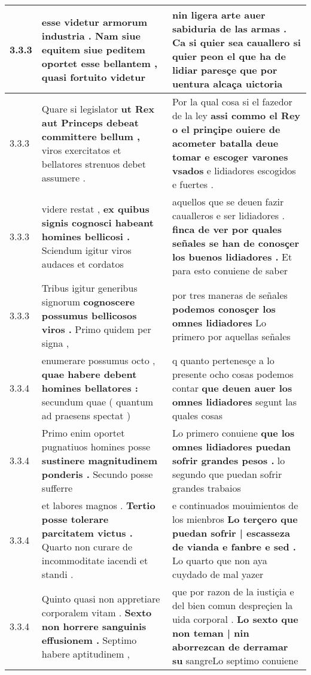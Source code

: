 \begin{tabular}{|p{1cm}|p{6.5cm}|p{6.5cm}|}
3.3.3 & esse videtur armorum industria . \textbf{ Nam siue equitem siue peditem oportet esse bellantem , } quasi fortuito videtur & nin ligera arte auer sabiduria de las armas . \textbf{ Ca si quier sea cauallero si quier peon el que ha de lidiar paresçe } que por uentura alcaça uictoria \\\hline
3.3.3 & Quare si legislator \textbf{ ut Rex aut Princeps debeat committere bellum , } viros exercitatos et bellatores strenuos debet assumere . & Por la qual cosa si el fazedor de la ley \textbf{ assi commo el Rey o el prinçipe ouiere de acometer batalla deue tomar e escoger varones vsados } e lidiadores escogidos e fuertes . \\\hline
3.3.3 & videre restat , \textbf{ ex quibus signis cognosci habeant homines bellicosi . } Sciendum igitur viros audaces et cordatos & aquellos que se deuen fazir caualleros e ser lidiadores . \textbf{ finca de ver por quales señales se han de conosçer los buenos lidiadores . } Et para esto conuiene de saber \\\hline
3.3.3 & Tribus igitur generibus signorum \textbf{ cognoscere possumus bellicosos viros . } Primo quidem per signa , & por tres maneras de señales \textbf{ podemos conosçer los omnes lidiadores } Lo primero por aquellas señales \\\hline
3.3.4 & enumerare possumus octo , \textbf{ quae habere debent homines bellatores : } secundum quae ( quantum ad praesens spectat ) & q quanto pertenesçe a lo presente ocho cosas podemos contar \textbf{ que deuen auer los omnes lidiadores } segunt las quales cosas \\\hline
3.3.4 & Primo enim oportet pugnatiuos homines posse \textbf{ sustinere magnitudinem ponderis . } Secundo posse sufferre & Lo primero conuiene \textbf{ que los omnes lidiadores puedan sofrir grandes pesos . } lo segundo que puedan sofrir grandes trabaios \\\hline
3.3.4 & et labores magnos . \textbf{ Tertio posse tolerare parcitatem victus . } Quarto non curare de incommoditate iacendi et standi . & e continuados mouimientos de los mienbros \textbf{ Lo terçero que puedan sofrir | escasseza de vianda e fanbre e sed . } Lo quarto que non aya cuydado de mal yazer \\\hline
3.3.4 & Quinto quasi non appretiare corporalem vitam . \textbf{ Sexto non horrere sanguinis effusionem . } Septimo habere aptitudinem , & que por razon de la iustiçia e del bien comun despreçien la uida corporal . \textbf{ Lo sexto que non teman | nin aborrezcan de derramar su } sangreLo septimo conuiene \\\hline

\end{tabular}

